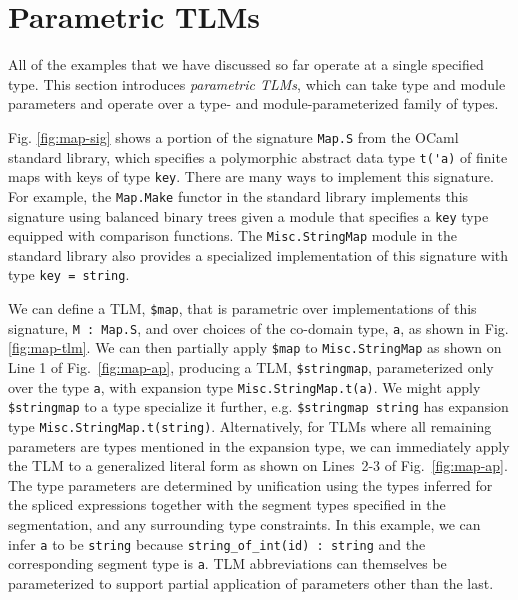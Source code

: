 \documentclass[acmsmall]{acmart}
\newcommand{\li}[1]{\lstinline[basicstyle=\ttfamily\fontsize{9pt}{1em}\selectfont]{#1}}
\begin{document}
\section{Parametric TLMs}
\label{sec:ptsms}

All of the examples that we have discussed so far operate at a single specified type. This section introduces \emph{parametric TLMs}, which can take type and module parameters and operate over a type- and module-parameterized family of types. %


Fig. \ref{fig:map-sig} shows a portion of the signature \li{Map.S} from the OCaml standard library, which specifies a polymorphic abstract data type \li{t('a)} of finite maps with keys of type \li{key}. There are many ways to implement this signature. For example, the \li{Map.Make} functor in the standard library implements this signature using balanced binary trees given a module that specifies a \li{key} type equipped with comparison functions. The \li{Misc.StringMap} module in the standard library also provides a specialized implementation of this signature with type \li{key = string}.

We can define a TLM, \li{$map}, that is parametric over implementations of this signature, \li{M : Map.S}, and over choices of the co-domain type, \li{a}, as shown in Fig. \ref{fig:map-tlm}. We can then partially apply \li{$map} to \li{Misc.StringMap} as shown on Line 1 of Fig.~\ref{fig:map-ap}, producing a TLM, \li{$stringmap},  parameterized only over the type \li{a}, with expansion type \li{Misc.StringMap.t(a)}. We might apply \li{$stringmap} to a type specialize it further, e.g. \li{$stringmap string} has expansion type \li{Misc.StringMap.t(string)}. Alternatively, for TLMs where all remaining parameters are types mentioned in the expansion type, we can immediately apply the TLM to a generalized literal form as shown on Lines~2-3 of Fig.~\ref{fig:map-ap}. The type parameters are determined by unification using the types inferred for the spliced expressions together with the segment types specified in the segmentation, and any surrounding type constraints. In this example, we can infer \li{a} to be \li{string} because \li{string_of_int(id) : string} and the corresponding segment type is \li{a}. TLM abbreviations can themselves be parameterized to support partial application of parameters other than the last.
\end{document}
